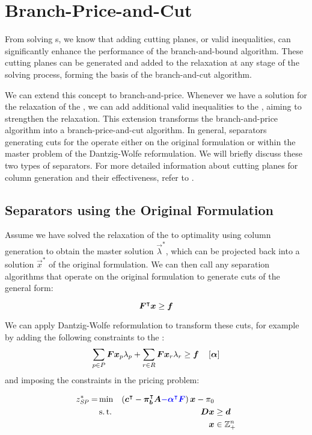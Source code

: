 \section{Branch-Price-and-Cut}\label{sec:cg_bp_bpc}
From solving \IP{}s, we know that adding cutting planes, or valid inequalities, can significantly enhance the performance of the branch-and-bound algorithm. These cutting planes can be generated and added to the \LP{} relaxation at any stage of the solving process, forming the basis of the branch-and-cut algorithm.

We can extend this concept to branch-and-price. Whenever we have a solution for the \LP{} relaxation of the \MP{}, we can add additional valid inequalities to the \RMP{}, aiming to strengthen the relaxation. This extension transforms the branch-and-price algorithm into a branch-price-and-cut algorithm. In general, separators generating cuts for the \MP{} operate either on the original formulation or within the master problem of the Dantzig-Wolfe reformulation. We will briefly discuss these two types of separators. For more detailed information about cutting planes for column generation and their effectiveness, refer to \cite{thebook, gamrath2010generic, witt2013separation}.

\subsection{Separators using the Original Formulation}
Assume we have solved the \LP{} relaxation of the \MP{} to optimality using column generation to obtain the master solution $\vec{\lambda}^*$, which can be projected back into a solution $\vec{x}^*$ of the original formulation. We can then call any separation algorithms that operate on the original formulation to generate cuts of the general form:

\begin{equation}
{\bm{F}}^\intercal {\bm{x}} \geq {\bm{f}}
\end{equation}

We can apply Dantzig-Wolfe reformulation to transform these cuts, for example by adding the following constraints to the \MP{}:
\begin{equation}
\sum_{p \in P} {\bm{F}} {\bm{x}}_p \lambda_p + \sum_{r \in R} {\bm{F}} {\bm{x}}_r \lambda_r \geq {\bm{f}} \quad \left[ {\bm{\alpha}} \right]
\end{equation}
and imposing the constraints in the pricing problem:

\begin{equation}
\begin{aligned}
z^*_\SP{} = &\min & \left( \vec{c}\transpose - \vec{\pi}_\vec{b}\transpose \mat{A} {\color{blue} - \vec{\alpha}\transpose \mat{F}}\right) \vec{x} - \pi_0 & \\
&\st & \mat{D} \vec{x} & \geq \vec{d} \\
&& \vec{x} & \in \mathbb{Z}_+^n
\end{aligned}
\end{equation}

